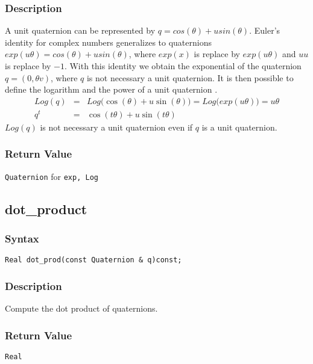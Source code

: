 \documentclass[11pt,fleqn,letterpaper]{report}
\begin{document}
\subsubsection{Description}
A unit quaternion can be represented by $q = cos(\theta) + u
sin(\theta)$. Euler's identity for complex numbers generalizes to
quaternions $exp(u\theta) = cos(\theta) + u sin(\theta)$, where
$exp(x)$ is replace by $exp(u\theta)$ and $uu$ is replace by $-1$.
With this identity we obtain the exponential of the quaternion $q =
(0,\theta v)$, where $q$ is not necessary a unit quaternion. It is
then possible to define the logarithm and the power of a unit
quaternion \cite{Dam98}.
\begin{eqnarray}
 Log(q) &=& Log\big(\cos(\theta) + u \sin(\theta)\big) =
 Log\big(exp(u\theta)\big) = u\theta \\
 q^t &=& \cos(t\theta) + u \sin(t\theta) 
\end{eqnarray}
$Log(q)$ is not necessary a unit quaternion even if $q$ is a unit
quaternion.

\subsubsection*{Return Value}

{\tt Quaternion} for \texttt{exp, Log}

\newpage

\subsection*{dot\_product}

\subsubsection*{Syntax}
\begin{verbatim}
Real dot_prod(const Quaternion & q)const;
\end{verbatim}
\subsubsection{Description}
Compute the dot product of quaternions.

\subsubsection*{Return Value}

{\tt Real}

\newpage
\end{document}
